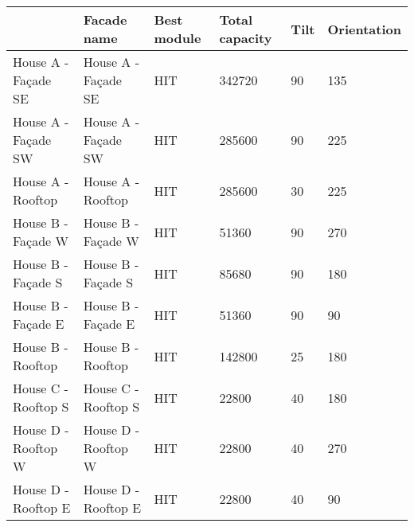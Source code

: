 \begin{tabular}{llllll}
\toprule
{} &          Facade name & Best module & Total capacity & Tilt & Orientation \\
\midrule
House A - Façade SE &  House A - Façade SE &         HIT &         342720 &   90 &         135 \\
House A - Façade SW &  House A - Façade SW &         HIT &         285600 &   90 &         225 \\
House A - Rooftop   &    House A - Rooftop &         HIT &         285600 &   30 &         225 \\
House B - Façade W  &   House B - Façade W &         HIT &          51360 &   90 &         270 \\
House B - Façade S  &   House B - Façade S &         HIT &          85680 &   90 &         180 \\
House B - Façade E  &   House B - Façade E &         HIT &          51360 &   90 &          90 \\
House B - Rooftop   &    House B - Rooftop &         HIT &         142800 &   25 &         180 \\
House C - Rooftop S &  House C - Rooftop S &         HIT &          22800 &   40 &         180 \\
House D - Rooftop W &  House D - Rooftop W &         HIT &          22800 &   40 &         270 \\
House D - Rooftop E &  House D - Rooftop E &         HIT &          22800 &   40 &          90 \\
\bottomrule
\end{tabular}
